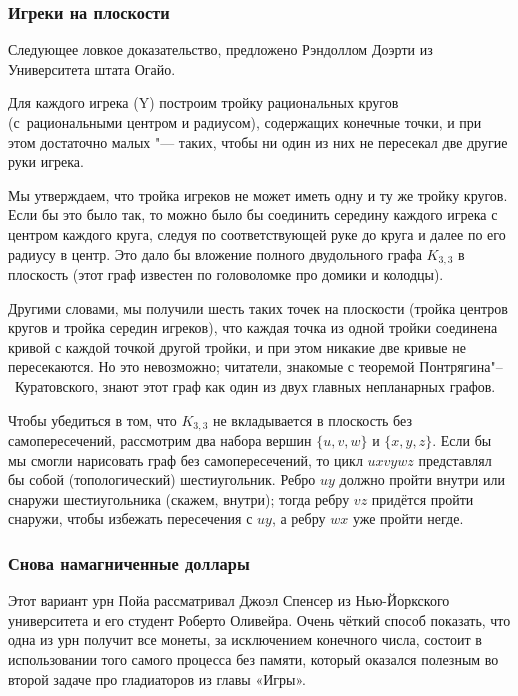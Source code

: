 \documentclass[twoside]{book}
\begin{document}
\subsubsection*{Игреки на плоскости}

Следующее ловкое  доказательство, предложено Рэндоллом Доэрти из Университета штата Огайо.

\medskip

Для каждого игрека (Y) построим тройку рациональных кругов (с~рациональными центром и радиусом), содержащих конечные точки, и при этом достаточно малых "--- таких, чтобы ни один из них не пересекал две другие руки игрека.

Мы утверждаем, что тройка игреков не может иметь одну и ту же тройку кругов.
Если бы это было так, то можно было бы соединить середину каждого игрека с центром каждого круга, следуя по соответствующей руке до круга и далее по его радиусу в центр.
Это дало бы вложение полного двудольного графа $K_{3,3}$ в плоскость (этот граф известен по головоломке про домики и колодцы).

Другими словами, мы получили шесть таких точек на плоскости (тройка центров кругов и тройка середин игреков), что каждая точка из одной тройки соединена кривой с каждой точкой другой тройки, и при этом никакие две кривые не пересекаются.
Но это невозможно; читатели, знакомые с теоремой Понтрягина"--~Куратовского, знают этот граф как один из двух главных непланарных графов.

Чтобы убедиться в том, что $K_{3,3}$ не вкладывается в плоскость без самопересечений, рассмотрим два набора вершин $\{u, v, w\}$ и $\{x, y, z\}$.
Если бы мы смогли нарисовать граф без самопересечений, то цикл $uxvywz$ представлял бы  собой (топологический) шестиугольник.
Ребро $uy$ должно пройти внутри или снаружи шестиугольника (скажем, внутри);
тогда ребру $vz$ придётся пройти снаружи, чтобы избежать пересечения с $uy$, а ребру $wx$ уже пройти негде.
\heart

\subsubsection*{Снова  намагниченные доллары}

Этот вариант урн Пойа рассматривал Джоэл Спенсер из Нью-Йоркского университета и его студент Роберто Оливейра.
Очень чёткий способ показать, что одна из урн получит все монеты, за исключением конечного числа, состоит в использовании того самого процесса без памяти, который оказался полезным во второй задаче про гладиаторов из главы «\mbox{Игры}».
\end{document}
